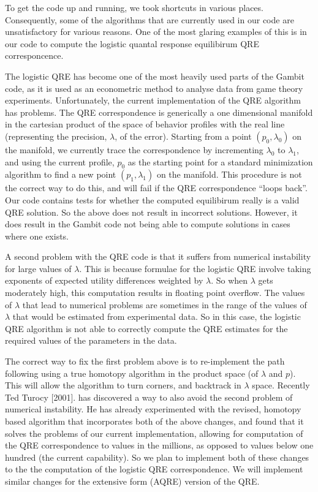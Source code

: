\documentclass[12pt]{article}
\begin{document}
To get the code up and running, we took shortcuts in various places.
Consequently, some of the algorithms that are currently used in our
code are unsatisfactory for various reasons. One of the most glaring
examples of this is in our code to compute the logistic quantal
response equilibirum QRE corresponcence.

The logistic QRE has become one of the most heavily used parts of the
Gambit code, as it is used as an econometric method to analyse data
from game theory experiments.  Unfortunately, the current
implementation of the QRE algorithm has problems.  The QRE
correspondence is generically a one dimensional manifold in the
cartesian product of the space of behavior profiles with the real line
(representing the precision, $\lambda$, of the error).  Starting from
a point $(p_0, \lambda_0)$ on the manifold, we currently trace the
correspondence by incrementing $\lambda_0$ to $\lambda_1$, and using
the current profile, $p_0$ as the starting point for a standard
minimization algorithm to find a new point $(p_1,\lambda_1)$ on the
manifold.  This procedure is not the correct way to do this, and will
fail if the QRE correspondence ``loops back''.  Our code contains
tests for whether the computed equilibirum really is a valid QRE
solution.  So the above does not result in incorrect solutions.
However, it does result in the Gambit code not being able to compute
solutions in cases where one exists.  

A second problem with the QRE code is that it suffers from numerical
instability for large values of $\lambda$.  This is because formulae
for the logistic QRE involve taking exponents of expected utility
differences weighted by $\lambda$.  So when $\lambda$ gets moderately
high, this computation results in floating point overflow.  The values
of $\lambda$ that lead to numerical problems are sometimes in the
range of the values of $\lambda$ that would be estimated from
experimental data.  So in this case, the logistic QRE algorithm is not
able to correctly compute the QRE estimates for the required values of
the parameters in the data.

The correct way to fix the first problem above is to re-implement the
path following using a true homotopy algorithm in the product space
(of $\lambda$ and $p$).  This will allow the algorithm to turn
corners, and backtrack in $\lambda$ space.  Recently Ted Turocy
[2001]. has discovered a way to also avoid the second problem of
numerical instability.  He has already experimented with the revised,
homotopy based algorithm that incorporates both of the above changes,
and found that it solves the problems of our current implementation,
allowing for computation of the QRE correspondence to values in the
millions, as opposed to values below one hundred (the current
capability).  So we plan to implement both of these changes to the the
computation of the logistic QRE correspondence.  We will implement
similar changes for the extensive form (AQRE) version of the QRE.
\end{document}
